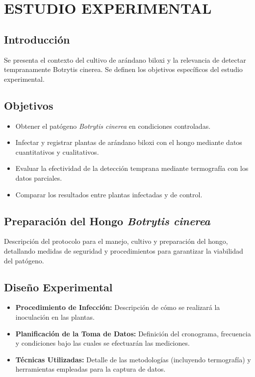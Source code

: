 \chapter{ESTUDIO EXPERIMENTAL}

\section{Introducción}
Se presenta el contexto del cultivo de arándano biloxi y la relevancia de detectar tempranamente Botrytis cinerea. Se definen los objetivos específicos del estudio experimental.

\section{Objetivos}
\begin{itemize}
    \item Obtener el patógeno \textit{Botrytis cinerea} en condiciones controladas.
    \item Infectar y registrar plantas de arándano biloxi con el hongo mediante datos cuantitativos y cualitativos.
    \item Evaluar la efectividad de la detección temprana mediante termografía con los datos parciales.
    \item Comparar los resultados entre plantas infectadas y de control.
\end{itemize}

\section{Preparación del Hongo \textit{Botrytis cinerea}}
Descripción del protocolo para el manejo, cultivo y preparación del hongo, detallando medidas de seguridad y procedimientos para garantizar la viabilidad del patógeno.

\section{Diseño Experimental}
\begin{itemize}
    \item \textbf{Procedimiento de Infección:} Descripción de cómo se realizará la inoculación en las plantas.
    \item \textbf{Planificación de la Toma de Datos:} Definición del cronograma, frecuencia y condiciones bajo las cuales se efectuarán las mediciones.
    \item \textbf{Técnicas Utilizadas:} Detalle de las metodologías (incluyendo termografía) y herramientas empleadas para la captura de datos.
\end{itemize}

